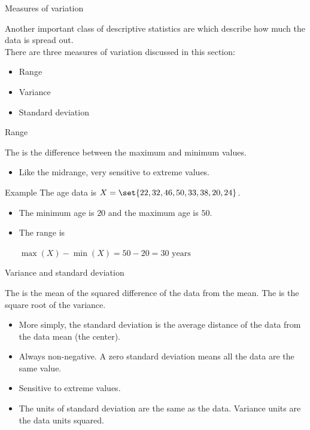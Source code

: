 \documentclass[xcolor=table, aspectratio=169, bigger, handout]{beamer}
\begin{document}
\begin{frame}{Measures of variation}
\begin{block}{}
Another important class of descriptive statistics are  which describe how much the data is spread out.\\
\medskip
There are three measures of variation discussed in this section:
\begin{itemize}
\item Range
\item Variance
\item Standard deviation
\end{itemize}

\end{block}
\end{frame}

\begin{frame}{Range}
\begin{block}{}
The  is the difference between the maximum and minimum values.
\begin{itemize}
\item Like the midrange, very sensitive to extreme values.
\end{itemize}
\end{block}

\pause
\begin{exampleblock}{Example}
The age data is $X = \set{22, 32, 46, 50, 33, 38, 20, 24}$.
\begin{itemize}
\item The minimum age is $20$ and the maximum age is $50$.
\pause
\item The range is \\
\smallskip
{\centering
$\max(X) - \min(X) = 50 - 20 = 30 \text{ years}$
\par}
\end{itemize}
\smallskip
\end{exampleblock}

\end{frame}

\begin{frame}{Variance and standard deviation}
\begin{block}{}
The  is the mean of the squared difference of the data from the mean. The  is the square root of the variance.
\begin{itemize}
\pause\item More simply, the standard deviation is the average distance of the data from the data mean (the center).
\pause\item Always non-negative. A zero standard deviation means all the data are the same value.
\pause\item Sensitive to extreme values.
\pause\item The units of standard deviation are the same as the data. Variance units are the data units squared.
\end{itemize}
\end{block}
\end{frame}
\end{document}
